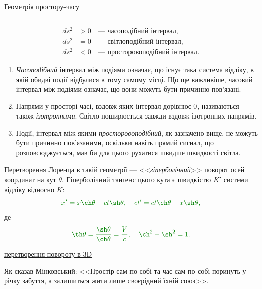 \documentclass[9pt]{beamer}
\begin{document}
\begin{frame}{Геометрія простору-часу}{}
\begin{columns}
\begin{column}{0.6\linewidth}
		\end{column}
	\end{columns}
	\vspace*{0.75em}
	\begin{overprint}
		\begin{center}\color{red}\small
			\begin{align*}
				ds^2 & > 0 \quad \text{--- часоподібний інтервал},       \\
				ds^2 & = 0 \quad \text{--- світлоподібний інтервал},     \\
				ds^2 & < 0 \quad \text{--- просторовоподібний інтервал}.
			\end{align*}
			\begin{enumerate}\scriptsize
				\item \emph{\color{blue}Часоподібний} інтервал між подіями означає, що існує така система відліку, в якій обидві події відбулися в тому самому місці. Що ще важливіше, часовий інтервал між подіями означає, що вони можуть бути причинно пов'язані.
				\item Напрями у просторі-часі, вздовж яких інтервал дорівнює 0, називаються також \emph{\color{blue}ізотропними}. Світло поширюється завжди вздовж ізотропних напрямів.
				\item Події, інтервал між якими \emph{\color{blue}просторовоподібний}, як зазначено вище, не можуть бути причинно пов'язаними, оскільки навіть прямий сигнал, що розповсюджується, мав би для цього рухатися швидше швидкості світла.
			\end{enumerate}
		\end{center}
		Перетворення Лоренца в такій геометрії --- <<\emph{\color{blue}гіперболічний}>> поворот осей координат на кут $ \theta $. Гіперболічний тангенс цього кута є швидкістю $ K' $ системи відліку відносно $ K $:
		\begin{equation*}\color{green!50!black}
			x' = x\ch\theta - ct\sh\theta, \quad ct' = ct\ch\theta - x \sh\theta ,
		\end{equation*}
		де
		\begin{equation*}\color{green!50!black}
			\th\theta = \frac{\sh\theta}{\ch\theta} = \frac{V}{c}, \quad \ch^2 - \sh^2 = 1.
		\end{equation*}

		\vfill

		{\tiny \href{https://uk.wikipedia.org/wiki/\%D0\%9C\%D0\%B0\%D1\%82\%D1\%80\%D0\%B8\%D1\%86\%D1\%8F_\%D0\%BF\%D0\%BE\%D0\%B2\%D0\%BE\%D1\%80\%D0\%BE\%D1\%82\%D1\%83}{перетворення повороту в 3D} }
		\onslide<3>\begin{block}{}
			Як сказав Мінковський: <<Простір сам по собі та час сам по собі поринуть у річку забуття, а залишиться жити лише своєрідний їхній союз>>.
		\end{block}
	\end{overprint}
\end{frame}
\end{document}
